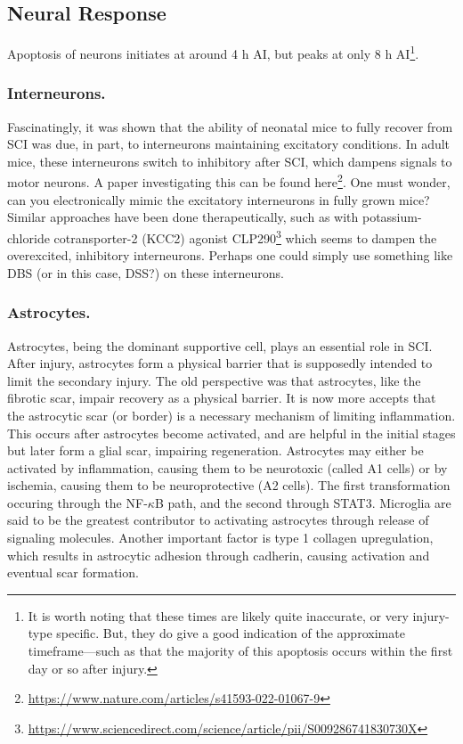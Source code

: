 \documentclass[12pt]{report}
\begin{document}
\subsection{Neural Response}

Apoptosis of neurons initiates at around 4 h AI, but peaks at only 8 h AI\footnote{It is worth noting that these times are likely quite inaccurate, or very injury-type specific. But, they do give a good indication of the approximate timeframe---such as that the majority of this apoptosis occurs within the first day or so after injury.}. 

\subsubsection{Interneurons.}
Fascinatingly, it was shown that the ability of neonatal mice to fully recover from SCI was due, in part, to interneurons maintaining excitatory conditions. In adult mice, these interneurons switch to inhibitory after SCI, which dampens signals to motor neurons. A paper investigating this can be found here\footnote{\url{https://www.nature.com/articles/s41593-022-01067-9}}. One must wonder, can you electronically mimic the excitatory interneurons in fully grown mice? Similar approaches have been done therapeutically, such as with potassium-chloride cotransporter-2 (KCC2) agonist CLP290\footnote{\url{https://www.sciencedirect.com/science/article/pii/S009286741830730X}} which seems to dampen the overexcited, inhibitory interneurons. Perhaps one could simply use something like DBS (or in this case, DSS?) on these interneurons.  

\subsubsection{Astrocytes.}
Astrocytes, being the dominant supportive cell, plays an essential role in SCI. After injury, astrocytes form a physical barrier that is supposedly intended to limit the secondary injury. The old perspective was that astrocytes, like the fibrotic scar, impair recovery as a physical barrier. It is now more accepts that the astrocytic scar (or border) is a necessary mechanism of limiting inflammation. This occurs after astrocytes become activated, and are helpful in the initial stages but later form a glial scar, impairing regeneration. Astrocytes may either be activated by inflammation, causing them to be neurotoxic (called A1 cells) or by ischemia, causing them to be neuroprotective (A2 cells). The first transformation occuring through the NF-$\kappa$B path, and the second through STAT3. Microglia are said to be the greatest contributor to activating astrocytes through release of signaling molecules. Another important factor is type 1 collagen upregulation, which results in astrocytic adhesion through cadherin, causing activation and eventual scar formation.\newline
\end{document}
